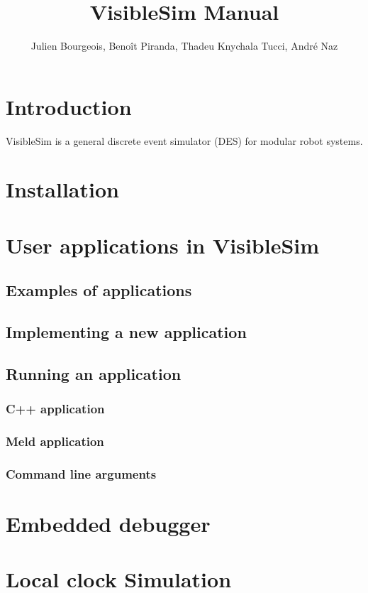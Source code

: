 \documentclass[11pt]{article}
\title{VisibleSim Manual}
\author{Julien Bourgeois, Benoît Piranda, Thadeu Knychala Tucci, André Naz}
\begin{document}
\maketitle

\section{Introduction}

VisibleSim is a general discrete event simulator (DES) for modular robot systems.

\section{Installation}

\section{User applications in VisibleSim}

\subsection{Examples of applications}

\subsection{Implementing a new application}

\subsection{Running an application}
\subsubsection{C++ application}
\subsubsection{Meld application}
\subsubsection{Command line arguments}

\section{Embedded debugger}

\section{Local clock Simulation}
\end{document}
